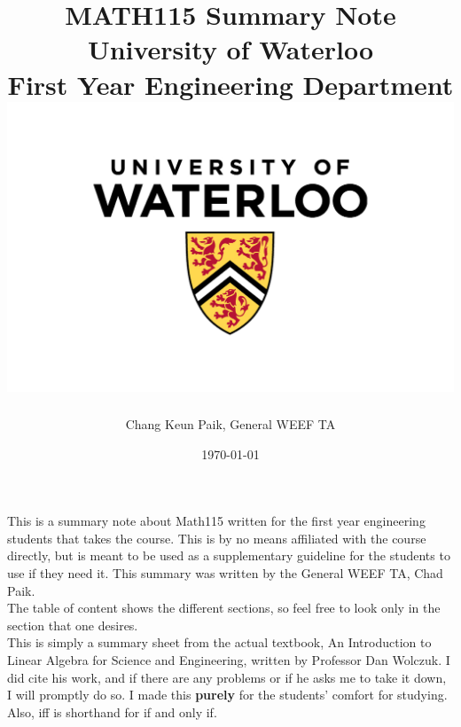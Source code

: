 \documentclass[12pt]{article}
\begin{document}

\begin{titlepage}
{\centering
\title{{MATH115 Summary Note}\\
{\huge University of Waterloo}\\
{\small  First Year Engineering Department}\\
{\includegraphics[scale=0.5]{UW.jpg}}}
\author{ \begin{tabular} {c} Chang Keun Paik, General WEEF TA \\
 \end{tabular}}
 \date {\today}
\maketitle
\par}
\thispagestyle{empty}
\end{titlepage}
\tableofcontents
\thispagestyle{empty}

\listoffigures
\thispagestyle{empty}
\clearpage

\setcounter{page}{1}


This is a summary note about Math115 written for the first year engineering students that takes the course. This is by no means affiliated with the course directly, but is meant to be used as a supplementary guideline for the students to use if they need it. This summary was written by the General WEEF TA, Chad Paik.\\
The table of content shows the different sections, so feel free to look only in the section that one desires.\\
This is simply a summary sheet from the actual textbook, An Introduction to Linear Algebra for Science and Engineering, written by Professor Dan Wolczuk. I did cite his work, and if there are any problems or if he asks me to take it down, I will promptly do so. I made this \textbf{purely} for the students' comfort for studying.\\
Also, iff is shorthand for if and only if.
\end{document}
